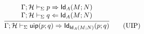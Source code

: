 \documentclass{amsart}
\begin{document}
\begin{equation}
  \infer{
    \Gamma;\mathcal{H}\vdash_\Sigma \mathsf{uip}(p; q)\infers\mathsf{Id}_{\mathsf{Id}_A(M;N)}(p;q)
  }{
    \begin{array}{l}
      \Gamma;\mathcal{H}\vdash_\Sigma p\infers \mathsf{Id}_A(M;N)\\
      \Gamma;\mathcal{H}\vdash_\Sigma q\checks \mathsf{Id}_A(M;N)
    \end{array}
  }
  \tag{UIP}
\end{equation}
\end{document}
